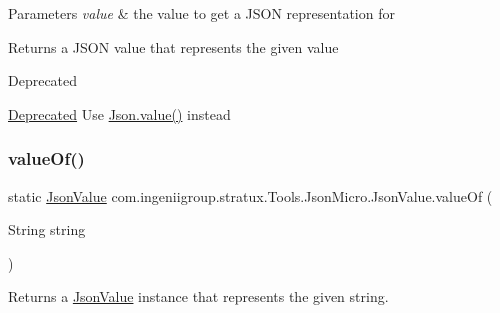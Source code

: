 \begin{DoxyParams}{Parameters}
{\em value} & the value to get a J\+S\+ON representation for \\
\hline
\end{DoxyParams}
\begin{DoxyReturn}{Returns}
a J\+S\+ON value that represents the given value 
\end{DoxyReturn}
\begin{DoxyRefDesc}{Deprecated}
\item[\hyperlink{deprecated__deprecated000013}{Deprecated}]Use {\ttfamily \hyperlink{classcom_1_1ingeniigroup_1_1stratux_1_1_tools_1_1_json_micro_1_1_json_aa7a17dbf2bbb667284cb5a86d404bf6d}{Json.\+value()}} instead \end{DoxyRefDesc}
\mbox{\label{classcom_1_1ingeniigroup_1_1stratux_1_1_tools_1_1_json_micro_1_1_json_value_a6c3cad61249eea7e6f83437e71681e9f}} 
\subsubsection{\texorpdfstring{value\+Of()}{valueOf()}\hspace{0.1cm}{\footnotesize\ttfamily [5/6]}}
{\footnotesize\ttfamily static \hyperlink{classcom_1_1ingeniigroup_1_1stratux_1_1_tools_1_1_json_micro_1_1_json_value}{Json\+Value} com.\+ingeniigroup.\+stratux.\+Tools.\+Json\+Micro.\+Json\+Value.\+value\+Of (\begin{DoxyParamCaption}\item[{String}]{string }\end{DoxyParamCaption})\hspace{0.3cm}{\ttfamily [static]}}

Returns a \hyperlink{classcom_1_1ingeniigroup_1_1stratux_1_1_tools_1_1_json_micro_1_1_json_value}{Json\+Value} instance that represents the given string.


